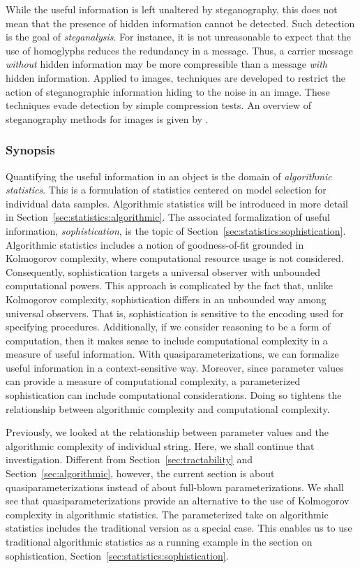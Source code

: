 While the useful information is left unaltered by steganography, this does not mean that the presence of hidden information cannot be detected.
Such detection is the goal of \emph{steganalysis}.
For instance, it is not unreasonable to expect that the use of homoglyphs reduces the redundancy in a message.
Thus, a carrier message \emph{without} hidden information may be more compressible than a message \emph{with} hidden information.
Applied to images, techniques are developed to restrict the action of steganographic information hiding to the noise in an image.
These techniques evade detection by simple compression tests.
An overview of steganography methods for images is given by \textcite{cheddad2010digital}.

\subsubsection{Synopsis}
Quantifying the useful information in an object is the domain of \emph{algorithmic statistics}.
This is a formulation of statistics centered on model selection for individual data samples.
Algorithmic statistics will be introduced in more detail in Section~\ref{sec:statistics:algorithmic}.
The associated formalization of useful information, \emph{sophistication}, is the topic of Section~\ref{sec:statistics:sophistication}.
Algorithmic statistics includes a notion of goodness-of-fit grounded in Kolmogorov complexity, where computational resource usage is not considered.
Consequently, sophistication targets a universal observer with unbounded computational powers.
This approach is complicated by the fact that, unlike Kolmogorov complexity, sophistication differs in an unbounded way among universal observers.
That is, sophistication is sensitive to the encoding used for specifying procedures.
Additionally, if we consider reasoning to be a form of computation, then it makes sense to include computational complexity in a measure of useful information.
With quasiparameterizations, we can formalize useful information in a context-sensitive way.
Moreover, since parameter values can provide a measure of computational complexity, a parameterized sophistication can include computational considerations.
Doing so tightens the relationship between algorithmic complexity and computational complexity.

Previously, we looked at the relationship between parameter values and the algorithmic complexity of individual string.
Here, we shall continue that investigation.
Different from Section~\ref{sec:tractability} and Section~\ref{sec:algorithmic}, however, the current section is about quasiparameterizations instead of about full-blown parameterizations.
We shall see that quasiparameterizations provide an alternative to the use of Kolmogorov complexity in algorithmic statistics.
The parameterized take on algorithmic statistics includes the traditional version as a special case.
This enables us to use traditional algorithmic statistics as a running example in the section on sophistication, Section~\ref{sec:statistics:sophistication}.

